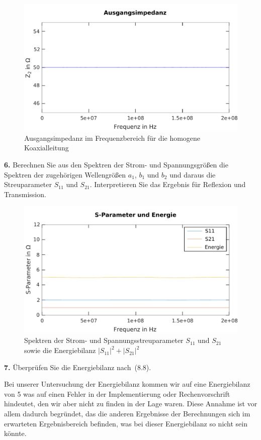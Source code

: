 \documentclass[Protokollheft.tex]{subfiles}
\begin{document}
\begin{figure}
	\centering
	\includegraphics[width=0.7\linewidth]{Ausgangsimpedanz}
	\caption{Ausgangsimpedanz im Frequenzbereich für die homogene Koaxialleitung}
	\label{fig:ausgangsimpedanz}
\end{figure}

\begin{framed}
	\noindent \textbf{6.} Berechnen Sie aus den Spektren der Strom- und 
Spannungsgrößen die Spektren der zugehörigen Wellengrößen $a_1$,
$b_1$ und $b_2$ und daraus die Streuparameter $S_{11}$ und
$S_{21}$. Interpretieren Sie das Ergebnis für Reflexion und
Transmission.\label{exer:calcWaveQuantities}
\end{framed}

\begin{figure}
	\centering
	\includegraphics[width=0.7\linewidth]{SParameterEnergie}
	\caption{Spektren der Strom- und Spannungsstreuparameter $S_{11}$ und $S_{21}$ sowie die Energiebilanz $|S_{11}|^2 + |S_{21}|^2$}
	\label{fig:sparameterenergie}
\end{figure}


\begin{framed}
	\noindent \textbf{7.} Überprüfen Sie die Energiebilanz nach~(8.8).\label{exer:checkEnergyBal4TLine}
\end{framed}

Bei unserer Untersuchung der Energiebilanz kommen wir auf eine Energiebilanz von 5 was auf einen Fehler in der Implementierung oder Rechenvorschrift hindeutet, den wir aber nicht zu finden in der Lage waren. Diese Annahme ist vor allem dadurch begründet, das die anderen Ergebnisse der Berechnungen sich im erwarteten Ergebnisbereich befinden, was bei dieser Energiebilanz so nicht sein könnte. 
\end{document}
